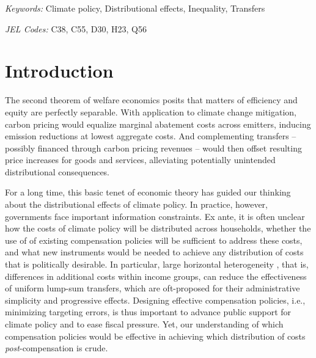\documentclass[12pt, a4paper]{article}
\begin{document}
\smallskip

\noindent \small \textit{Keywords:} Climate policy, Distributional effects, Inequality, Transfers

\noindent \small \textit{JEL Codes:} C38, C55, D30, H23, Q56


\clearpage

\setcounter{page}{1}

\normalsize

\section{Introduction} \label{sec:introduction}

The second theorem of welfare economics posits that matters of efficiency and equity are perfectly separable. With application to climate change mitigation, carbon pricing would equalize marginal abatement costs across emitters, inducing emission reductions at lowest aggregate costs. And complementing transfers -- possibly financed through carbon pricing revenues -- would then offset resulting price increases for goods and services, alleviating potentially unintended distributional consequences.

For a long time, this basic tenet of economic theory has guided our thinking about the distributional effects of climate policy. In practice, however, governments face important information constraints. Ex ante, it is often unclear how the costs of climate policy will be distributed across households, whether the use of of existing compensation policies will be sufficient to address these costs, and what new instruments would be needed to achieve any distribution of costs that is politically desirable. In particular, large horizontal heterogeneity \autocite{Fischer.2019,Hansel.2022}, that is, differences in additional costs within income groups, can reduce the effectiveness of uniform lump-sum transfers, which are oft-proposed for their administrative simplicity and progressive effects. Designing effective compensation policies, i.e., minimizing targeting errors, is thus important to advance public support for climate policy \autocite{MaestreAndres.2019,Dechezlepretre.2025} and to ease fiscal pressure. Yet, our understanding of which compensation policies would be effective in achieving which distribution of costs \textit{post}-compensation is crude.
\end{document}
